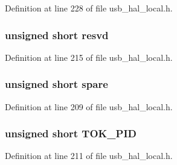 Definition at line 228 of file usb\+\_\+hal\+\_\+local.\+h.

\hypertarget{union___b_d_t___s_e_t_u_p_ae3dc0e4d24d0518699d8f081ba58f91c}{}
\subsubsection[{resvd}]{\setlength{\rightskip}{0pt plus 5cm}unsigned short resvd}\label{union___b_d_t___s_e_t_u_p_ae3dc0e4d24d0518699d8f081ba58f91c}


Definition at line 215 of file usb\+\_\+hal\+\_\+local.\+h.

\hypertarget{union___b_d_t___s_e_t_u_p_a98efda18e7b0a66854cd9b0963832b1a}{}
\subsubsection[{spare}]{\setlength{\rightskip}{0pt plus 5cm}unsigned short spare}\label{union___b_d_t___s_e_t_u_p_a98efda18e7b0a66854cd9b0963832b1a}


Definition at line 209 of file usb\+\_\+hal\+\_\+local.\+h.

\hypertarget{union___b_d_t___s_e_t_u_p_ab086222f79219297398191e002f9cd19}{}
\subsubsection[{T\+O\+K\+\_\+\+P\+I\+D}]{\setlength{\rightskip}{0pt plus 5cm}unsigned short T\+O\+K\+\_\+\+P\+I\+D}\label{union___b_d_t___s_e_t_u_p_ab086222f79219297398191e002f9cd19}


Definition at line 211 of file usb\+\_\+hal\+\_\+local.\+h.

\hypertarget{union___b_d_t___s_e_t_u_p_a5580d5dc191e4f973fcfa5feaa34369f}{}
